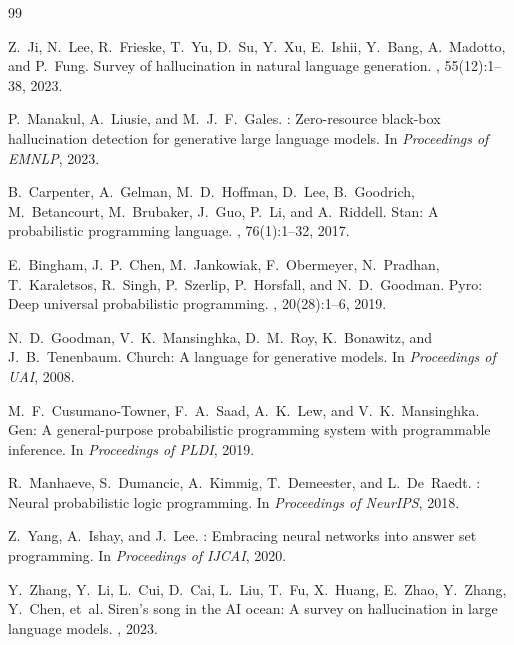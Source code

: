 \documentclass[11pt,a4paper]{article}
\begin{document}
\begin{thebibliography}{99}

Z.~Ji, N.~Lee, R.~Frieske, T.~Yu, D.~Su, Y.~Xu, E.~Ishii, Y.~Bang,
A.~Madotto, and P.~Fung.
\newblock Survey of hallucination in natural language generation.
, 55(12):1--38, 2023.

P.~Manakul, A.~Liusie, and M.~J.~F.~Gales.
: Zero-resource black-box hallucination detection for
  generative large language models.
\newblock In {\em Proceedings of EMNLP}, 2023.

B.~Carpenter, A.~Gelman, M.~D.~Hoffman, D.~Lee, B.~Goodrich, M.~Betancourt,
M.~Brubaker, J.~Guo, P.~Li, and A.~Riddell.
\newblock Stan: A probabilistic programming language.
, 76(1):1--32, 2017.

E.~Bingham, J.~P.~Chen, M.~Jankowiak, F.~Obermeyer, N.~Pradhan,
T.~Karaletsos, R.~Singh, P.~Szerlip, P.~Horsfall, and N.~D.~Goodman.
\newblock Pyro: Deep universal probabilistic programming.
, 20(28):1--6, 2019.

N.~D.~Goodman, V.~K.~Mansinghka, D.~M.~Roy, K.~Bonawitz, and
J.~B.~Tenenbaum.
\newblock Church: A language for generative models.
\newblock In {\em Proceedings of UAI}, 2008.

M.~F.~Cusumano-Towner, F.~A.~Saad, A.~K.~Lew, and V.~K.~Mansinghka.
\newblock Gen: A general-purpose probabilistic programming system with
  programmable inference.
\newblock In {\em Proceedings of PLDI}, 2019.

R.~Manhaeve, S.~Dumancic, A.~Kimmig, T.~Demeester, and L.~De~Raedt.
: Neural probabilistic logic programming.
\newblock In {\em Proceedings of NeurIPS}, 2018.

Z.~Yang, A.~Ishay, and J.~Lee.
: Embracing neural networks into answer set programming.
\newblock In {\em Proceedings of IJCAI}, 2020.

Y.~Zhang, Y.~Li, L.~Cui, D.~Cai, L.~Liu, T.~Fu, X.~Huang, E.~Zhao,
Y.~Zhang, Y.~Chen, et~al.
\newblock Siren's song in the {AI} ocean: A survey on hallucination in large
  language models.
, 2023.


\end{thebibliography}
\end{document}
